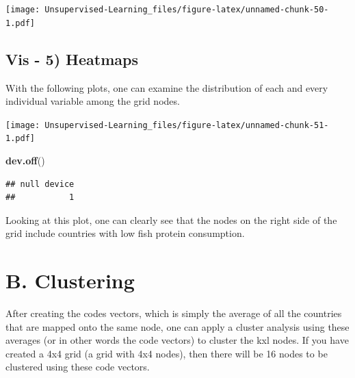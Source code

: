 \documentclass[
]{book}
\newenvironment{Shaded}{\begin{snugshade}}{\end{snugshade}}
\newcommand{\ControlFlowTok}[1]{\textcolor[rgb]{0.13,0.29,0.53}{\textbf{#1}}}
\newcommand{\DataTypeTok}[1]{\textcolor[rgb]{0.13,0.29,0.53}{#1}}
\newcommand{\DecValTok}[1]{\textcolor[rgb]{0.00,0.00,0.81}{#1}}
\newcommand{\KeywordTok}[1]{\textcolor[rgb]{0.13,0.29,0.53}{\textbf{#1}}}
\newcommand{\NormalTok}[1]{#1}
\newcommand{\OperatorTok}[1]{\textcolor[rgb]{0.81,0.36,0.00}{\textbf{#1}}}
\newcommand{\StringTok}[1]{\textcolor[rgb]{0.31,0.60,0.02}{#1}}
\begin{document}
\texttt{[image: Unsupervised-Learning\_files/figure-latex/unnamed-chunk-50-1.pdf]}

\hypertarget{vis---5-heatmaps}{%
\subsection{Vis - 5) Heatmaps}\label{vis---5-heatmaps}}

With the following plots, one can examine the distribution of each and every individual variable among the grid nodes.

\begin{Shaded}
\end{Shaded}

\texttt{[image: Unsupervised-Learning\_files/figure-latex/unnamed-chunk-51-1.pdf]}

\begin{Shaded}
\begin{Highlighting}[]
\KeywordTok{dev.off}\NormalTok{()}
\end{Highlighting}
\end{Shaded}

\begin{verbatim}
## null device 
##           1
\end{verbatim}

Looking at this plot, one can clearly see that the nodes on the right side of the grid include countries with low fish protein consumption.

\hypertarget{b.-clustering}{%
\section{B. Clustering}\label{b.-clustering}}

After creating the codes vectors, which is simply the average of all the countries that are mapped onto the same node, one can apply a cluster analysis using these averages (or in other words the code vectors) to cluster the kxl nodes. If you have created a 4x4 grid (a grid with 4x4 nodes), then there will be 16 nodes to be clustered using these code vectors.
\end{document}
